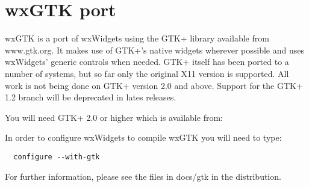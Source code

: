 \section{wxGTK port}\label{wxgtkport}

wxGTK is a port of wxWidgets using the GTK+ library available
from www.gtk.org. It makes use of GTK+'s native widgets wherever
possible and uses wxWidgets' generic controls when needed. GTK+
itself has been ported to a number of systems, but so far only the
original X11 version is supported. All work is not being done on
GTK+ version 2.0 and above. Support for the GTK+ 1.2 branch will
be deprecated in lates releases.

You will need GTK+ 2.0 or higher which is available from:


In order to configure wxWidgets to compile wxGTK you will 
need to type:

\begin{verbatim}
  configure --with-gtk
\end{verbatim}

For further information, please see the files in docs/gtk
in the distribution.


